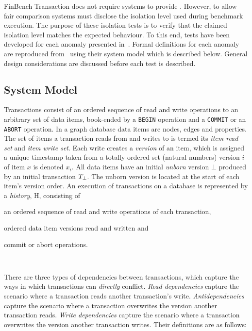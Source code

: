 FinBench Transaction does not require systems to provide .
However, to allow fair comparison systems must disclose the isolation level used
during benchmark execution. The purpose of these isolation tests is to verify 
that the claimed isolation level matches the expected behaviour. To this end, 
tests have been developed for each anomaly presented 
in~\cite{DBLP:journals/tods/BailisFGHS16}. Formal definitions for each anomaly 
are reproduced from~\cite{adya1999weak,DBLP:journals/tods/BailisFGHS16} using 
their system model which is described below. General design considerations are 
discussed before each test is described.

\subsection{System Model}
\label{sec:system-model}

Transactions consist of an ordered sequence of read and write operations to an
arbitrary set of data items, book-ended by a \texttt{BEGIN} operation and a 
\texttt{COMMIT} or an \texttt{ABORT} operation. In a graph database data items 
are nodes, edges and properties. The set of items a transaction reads from and 
writes to is termed its \emph{item read set} and \emph{item write set}. Each 
write creates a \emph{version} of an item, which is assigned a unique timestamp
taken from a totally ordered set (\eg natural numbers) version $i$ of item $x$ 
is denoted $x_i$. All data items have an initial \emph{unborn} version $\bot$ 
produced by an initial transaction $T_{\bot}$. The unborn version is 
located at the start of each item's version order. An execution of transactions
on a database is represented by a \emph{history}, H, consisting of
\begin{enumerate*}[label={(\roman*)}]
  \item an ordered sequence of read and write operations of each transaction,
  \item ordered data item versions read and written and
  \item commit or abort operations.
\end{enumerate*}~\cite{DBLP:journals/tods/BailisFGHS16}

There are three types of dependencies between transactions, which capture the 
ways in which transactions can \emph{directly} conflict. \emph{Read dependencies} 
capture the scenario where a transaction reads another transaction's write. 
\emph{Antidependencies} capture the scenario where a transaction overwrites the 
version another transaction reads. \emph{Write dependencies} capture the 
scenario where a transaction overwrites the version another transaction writes. 
Their definitions are as follows:

